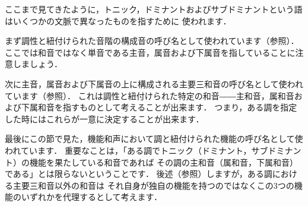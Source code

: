 \documentclass[dvipdfmx,uplatex,b5paper,openany,jbase=12Q,nomag*,textwidth-limit=44%
               ]{gachimuchi}
\begin{document}
\begin{NB}
ここまで見てきたように，トニック，ドミナントおよびサブドミナントという語はいくつかの文脈で異なったものを指すために
使われます．

まず調性と紐付けられた音階の構成音の呼び名として使われています（参照）．
ここでは和音ではなく単音である主音，属音および下属音を指していることに注意しましょう．

次に主音，属音および下属音の上に構成される主要三和音の呼び名として使われています（参照）．
これは調性と紐付けられた特定の和音――主和音，属和音および下属和音を指すものとして考えることが出来ます．
つまり，ある調を指定した時にはこれらが一意に決定することが出来ます．

最後にこの節で見た，機能和声において調と紐付けられた機能の呼び名として使われています．
重要なことは，「ある調でトニック（ドミナント，サブドミナント）の機能を果たしている和音であれば
その調の主和音（属和音，下属和音）である」とは限らないということです．
後述（参照）しますが，ある調における主要三和音以外の和音は
それ自身が独自の機能を持つのではなくこの3つの機能のいずれかを代理するとして考えます．
\end{NB}

\end{document}
